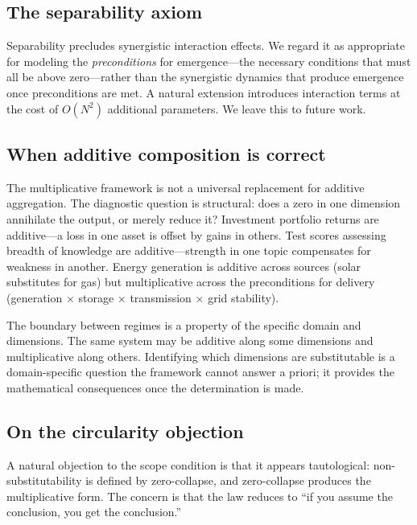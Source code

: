 \documentclass[12pt, a4paper]{article}
\theoremstyle{definition}
\theoremstyle{remark}
\begin{document}
\subsection{The separability axiom}\label{sec:separability}

Separability precludes synergistic interaction effects. We regard it as appropriate for modeling the \textit{preconditions} for emergence---the necessary conditions that must all be above zero---rather than the synergistic dynamics that produce emergence once preconditions are met. A natural extension introduces interaction terms at the cost of $O(N^2)$ additional parameters. We leave this to future work.

\subsection{When additive composition is correct}\label{sec:whenadd}

The multiplicative framework is not a universal replacement for additive aggregation. The diagnostic question is structural: does a zero in one dimension annihilate the output, or merely reduce it? Investment portfolio returns are additive---a loss in one asset is offset by gains in others. Test scores assessing breadth of knowledge are additive---strength in one topic compensates for weakness in another. Energy generation is additive across sources (solar substitutes for gas) but multiplicative across the preconditions for delivery (generation $\times$ storage $\times$ transmission $\times$ grid stability).

The boundary between regimes is a property of the specific domain and dimensions. The same system may be additive along some dimensions and multiplicative along others. Identifying which dimensions are substitutable is a domain-specific question the framework cannot answer a priori; it provides the mathematical consequences once the determination is made.

\subsection{On the circularity objection}\label{sec:circularity}

A natural objection to the scope condition is that it appears tautological: non-substitutability is defined by zero-collapse, and zero-collapse produces the multiplicative form. The concern is that the law reduces to ``if you assume the conclusion, you get the conclusion.''
\end{document}
